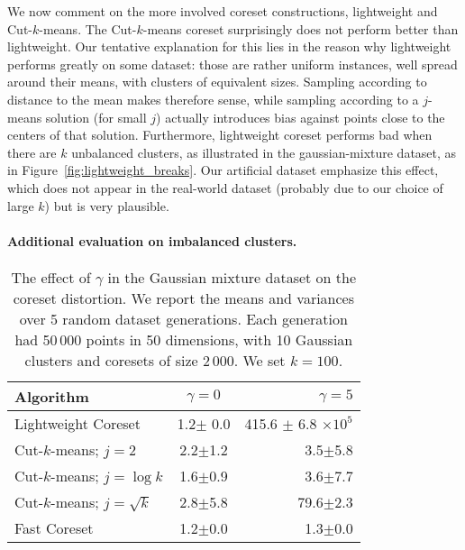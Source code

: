 We now comment on the more involved coreset constructions, lightweight and Cut-$k$-means. 
The Cut-$k$-means coreset surprisingly does not perform better than lightweight. Our tentative explanation for this lies in the reason why lightweight performs greatly on some dataset: those are rather uniform instances, well spread around their means, with clusters of equivalent sizes. 
Sampling according to distance to the mean makes therefore sense, while sampling according to a $j$-means solution (for small $j$) actually introduces bias against points close to the centers of that solution.
 Furthermore, lightweight coreset performs bad when there are $k$ unbalanced clusters, as illustrated in the gaussian-mixture dataset, as in Figure~\ref{fig:lightweight_breaks}.
Our artificial dataset emphasize this effect, which does not appear in the real-world dataset (probably due to our choice of large $k$) but is very plausible.


\paragraph*{Additional evaluation on imbalanced clusters.}

\begin{table}[htbp]
    \label{tbl:class-imbalance}
    \centering
    \begin{tabular}{lcr}
        Algorithm & $\gamma = 0$ & $\gamma = 5$ \\
        \hline
        Lightweight Coreset & 1.2$\pm$ 0.0 & 415.6 $\pm$ 6.8 $\times 10^5$ \\
        Cut-$k$-means; $j=2$ & 2.2$\pm$1.2 & 3.5$\pm$5.8 \\
        Cut-$k$-means; $j=\log k$ & 1.6$\pm$0.9 & 3.6$\pm$7.7 \\
        Cut-$k$-means; $j=\sqrt{k}$ & 2.8$\pm$5.8 & 79.6$\pm$2.3 \\
        Fast Coreset & 1.2$\pm$0.0 & 1.3$\pm$0.0
    \end{tabular}
    \caption{The effect of $\gamma$ in the Gaussian mixture dataset on the coreset distortion. We report the means and variances over 5 random dataset generations.
    Each generation had 50\,000 points in 50 dimensions, with 10 Gaussian clusters and coresets of size 2\,000. We set $k=100$.}
\end{table}

